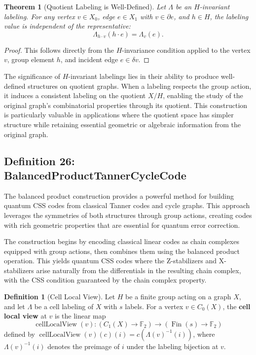 \documentclass[11pt]{article}
\theoremstyle{plain}
\newtheorem*{theorem}{Theorem}
\theoremstyle{definition}
\newtheorem*{definition}{Definition}
\theoremstyle{remark}
\begin{document}
\begin{theorem}[Quotient Labeling is Well-Defined]
Let $\Lambda$ be an $H$-invariant labeling. For any vertex $v \in X_0$, edge $e \in X_1$ with $v \in \partial e$, and $h \in H$, the labeling value is independent of the representative:
\[
\Lambda_{h \cdot v}(h \cdot e) = \Lambda_v(e).
\]
\end{theorem}

\begin{proof}
This follows directly from the $H$-invariance condition applied to the vertex $v$, group element $h$, and incident edge $e \in \delta v$.
\end{proof}

The significance of $H$-invariant labelings lies in their ability to produce well-defined structures on quotient graphs. When a labeling respects the group action, it induces a consistent labeling on the quotient $X/H$, enabling the study of the original graph's combinatorial properties through its quotient. This construction is particularly valuable in applications where the quotient space has simpler structure while retaining essential geometric or algebraic information from the original graph.

\vspace{1em}

\subsection{Definition 26: BalancedProductTannerCycleCode}

The balanced product construction provides a powerful method for building quantum CSS codes from classical Tanner codes and cycle graphs. This approach leverages the symmetries of both structures through group actions, creating codes with rich geometric properties that are essential for quantum error correction.

The construction begins by encoding classical linear codes as chain complexes equipped with group actions, then combines them using the balanced product operation. This yields quantum CSS codes where the Z-stabilizers and X-stabilizers arise naturally from the differentials in the resulting chain complex, with the CSS condition guaranteed by the chain complex property.

\begin{definition}[Cell Local View]
Let $H$ be a finite group acting on a graph $X$, and let $\Lambda$ be a cell labeling of $X$ with $s$ labels. For a vertex $v \in C_0(X)$, the \textbf{cell local view} at $v$ is the linear map
\[
\operatorname{cellLocalView}(v) : (C_1(X) \to \mathbb{F}_2) \to (\operatorname{Fin}(s) \to \mathbb{F}_2)
\]
defined by $\operatorname{cellLocalView}(v)(c)(i) = c(\Lambda(v)^{-1}(i))$, where $\Lambda(v)^{-1}(i)$ denotes the preimage of $i$ under the labeling bijection at $v$.
\end{definition}
\end{document}
